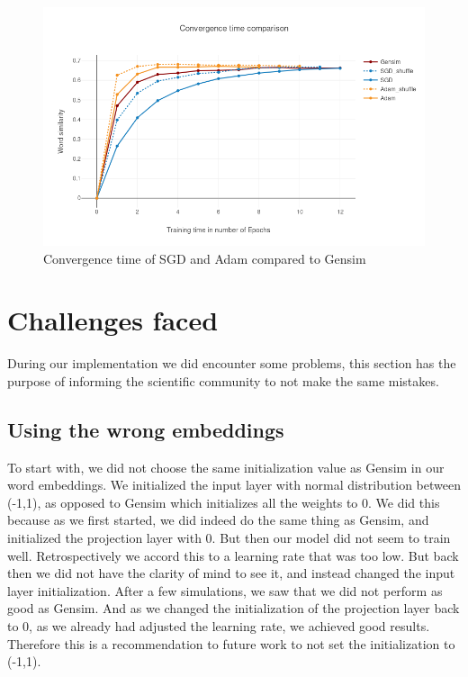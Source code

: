 \begin{figure}[H]
    \centering
            \includegraphics[scale=0.45]{images/gensim_vs_adam} 
    \caption{Convergence time of SGD and Adam compared to Gensim}
    \label{fig:gensim_vs_adam}
\end{figure}

\section{Challenges faced}
During our implementation we did encounter some problems, this section has the purpose of informing the scientific community to not make the same mistakes. 
\subsection{Using the wrong embeddings}
To start with, we did not choose the same initialization value as Gensim in our word embeddings. We initialized the input layer with normal distribution between (-1,1), as opposed to Gensim which initializes all the weights to 0. We did this because as we first started, we did indeed do the same thing as Gensim, and initialized the projection layer with 0. But then our model did not seem to train well. Retrospectively we accord this to a learning rate that was too low. But back then we did not have the clarity of mind to see it, and instead changed the input layer initialization. After a few simulations, we saw that we did not perform as good as Gensim. And as we changed the initialization of the projection layer back to 0, as we already had adjusted the learning rate, we achieved good results. Therefore this is a recommendation to future work to not set the initialization to (-1,1).

